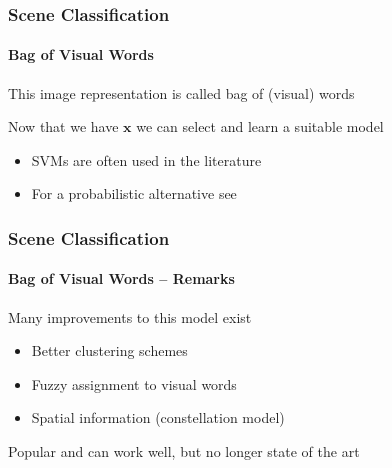\documentclass[xetex,professionalfont]{beamer}
\renewcommand{\vec}[1]{\ensuremath{\mathbf{#1}}}
\newcommand{\vx}{\vec{x}}
\renewcommand\emph[1]{\textcolor{tuwcvl_inf_red}{#1}}
\begin{document}

\begin{frame}
\frametitle{Scene Classification}
\framesubtitle{Bag of Visual Words}

This image representation is called \emph{bag of (visual) words}

\bigskip
Now that we have $\vx$ we can select and learn a suitable model
\begin{itemize}
    \item SVMs are often used in the literature
    \item For a probabilistic alternative see \cite{prince12}
\end{itemize}

\end{frame}


\begin{frame}
\frametitle{Scene Classification}
\framesubtitle{Bag of Visual Words -- Remarks}

Many improvements to this model exist
\begin{itemize}
    \item Better clustering schemes
    \item Fuzzy assignment to visual words
    \item Spatial information (constellation model)
\end{itemize}

\bigskip
Popular and can work well, but no longer state of the art %

\end{frame}


{
\begin{frame}


\end{frame}
}

\end{document}
